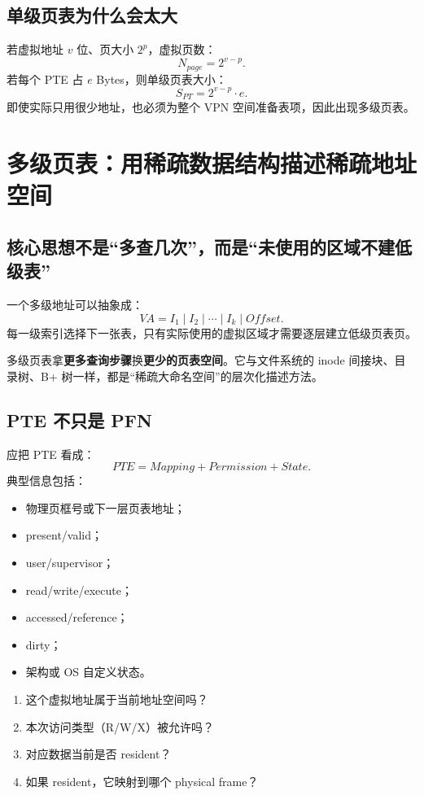 \documentclass[11pt,a4paper]{ctexart}
\newcommand{\kw}[1]{\textbf{#1}}
\begin{document}
\subsection{单级页表为什么会太大}
若虚拟地址 $v$ 位、页大小 $2^p$，虚拟页数：
\[
N_{page}=2^{v-p}.
\]
若每个 PTE 占 $e$ Bytes，则单级页表大小：
\[
S_{PT}=2^{v-p}\cdot e.
\]
即使实际只用很少地址，也必须为整个 VPN 空间准备表项，因此出现多级页表。

\section{多级页表：用稀疏数据结构描述稀疏地址空间}

\subsection{核心思想不是“多查几次”，而是“未使用的区域不建低级表”}
一个多级地址可以抽象成：
\[
VA=I_1\mid I_2\mid\cdots\mid I_k\mid Offset.
\]
每一级索引选择下一张表，只有实际使用的虚拟区域才需要逐层建立低级页表页。

\begin{bridge}
多级页表拿\kw{更多查询步骤}换\kw{更少的页表空间}。它与文件系统的 inode 间接块、目录树、B+ 树一样，都是“稀疏大命名空间”的层次化描述方法。
\end{bridge}

\subsection{PTE 不只是 PFN}
应把 PTE 看成：
\[
\boxed{PTE=Mapping+Permission+State}.
\]
典型信息包括：
\begin{itemize}
  \item 物理页框号或下一层页表地址；
  \item present/valid；
  \item user/supervisor；
  \item read/write/execute；
  \item accessed/reference；
  \item dirty；
  \item 架构或 OS 自定义状态。
\end{itemize}

\begin{exam}[一条访存真正提出的四个问题]
\begin{enumerate}
  \item 这个虚拟地址属于当前地址空间吗？
  \item 本次访问类型（R/W/X）被允许吗？
  \item 对应数据当前是否 resident？
  \item 如果 resident，它映射到哪个 physical frame？
\end{enumerate}
\end{exam}
\end{document}
